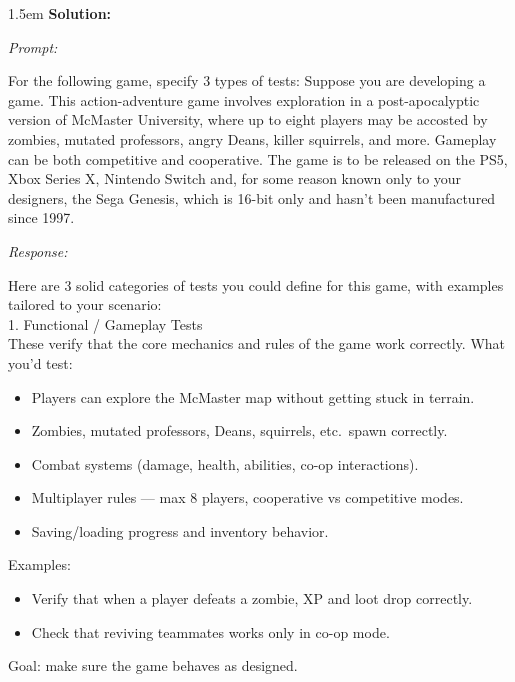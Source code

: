 \documentclass[10pt]{article}
\newenvironment{solution}{
	\vspace{.5em}
	\par
	\begin{adjustwidth}{1.5em}{}
	\textbf{{Solution:}}
	\par
	\vspace{.5em}
}{
	\vspace{1em}
	\end{adjustwidth}
}
\newenvironment{transcript}[1]{
	\vspace{.5em}
	\par
	\noindent
	\emph{#1:}
	\par
	\vspace{.5em}
}{
	\vspace{.5em}
}
\begin{document}
\begin{solution}
	\begin{transcript}{Prompt}
		For the following game, specify 3 types of tests: Suppose you are developing a game. This action-adventure game involves exploration in a post-apocalyptic version of McMaster University, where up to eight players may be accosted by zombies, mutated professors, angry Deans, killer squirrels, and more. Gameplay can be both competitive and cooperative. The game is to be released on the PS5, Xbox Series X, Nintendo Switch and, for some reason known only to your designers, the Sega Genesis, which is 16-bit only and hasn't been manufactured since 1997.
	\end{transcript}

	\begin{transcript}{Response}
		Here are 3 solid categories of tests you could define for this game, with examples tailored to your scenario: \\

		1. Functional / Gameplay Tests \\

		These verify that the core mechanics and rules of the game work correctly. What you'd test: \\
		\begin{itemize}
			\item Players can explore the McMaster map without getting stuck in terrain.
			\item Zombies, mutated professors, Deans, squirrels, etc.\ spawn correctly.
			\item Combat systems (damage, health, abilities, co-op interactions).
			\item Multiplayer rules --- max 8 players, cooperative vs competitive modes.
			\item Saving/loading progress and inventory behavior. \\
		\end{itemize}

		Examples: \\
		\begin{itemize}
			\item Verify that when a player defeats a zombie, XP and loot drop correctly.
			\item Check that reviving teammates works only in co-op mode. \\
		\end{itemize}

		Goal: make sure the game behaves as designed. \\


\end{transcript}
\end{solution}
\end{document}
